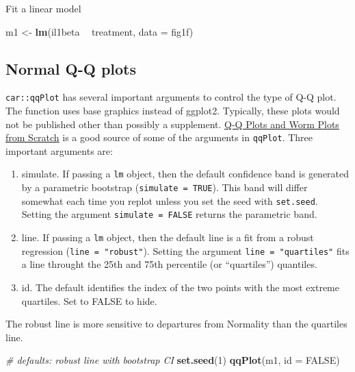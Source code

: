 \documentclass[]{book}
\newenvironment{Shaded}{\begin{snugshade}}{\end{snugshade}}
\newcommand{\CommentTok}[1]{\textcolor[rgb]{0.56,0.35,0.01}{\textit{#1}}}
\newcommand{\DataTypeTok}[1]{\textcolor[rgb]{0.13,0.29,0.53}{#1}}
\newcommand{\DecValTok}[1]{\textcolor[rgb]{0.00,0.00,0.81}{#1}}
\newcommand{\KeywordTok}[1]{\textcolor[rgb]{0.13,0.29,0.53}{\textbf{#1}}}
\newcommand{\NormalTok}[1]{#1}
\newcommand{\OperatorTok}[1]{\textcolor[rgb]{0.81,0.36,0.00}{\textbf{#1}}}
\newcommand{\OtherTok}[1]{\textcolor[rgb]{0.56,0.35,0.01}{#1}}
\newcommand{\StringTok}[1]{\textcolor[rgb]{0.31,0.60,0.02}{#1}}
\providecommand{\tightlist}{%
  \setlength{\itemsep}{0pt}\setlength{\parskip}{0pt}}
\begin{document}
Fit a linear model

\begin{Shaded}
\begin{Highlighting}[]
\NormalTok{m1 <-}\StringTok{ }\KeywordTok{lm}\NormalTok{(il1beta }\OperatorTok{~}\StringTok{ }\NormalTok{treatment,}
         \DataTypeTok{data =}\NormalTok{ fig1f)}
\end{Highlighting}
\end{Shaded}

\hypertarget{normal-q-q-plots}{%
\subsection{Normal Q-Q plots}\label{normal-q-q-plots}}

\texttt{car::qqPlot} has several important arguments to control the type of Q-Q plot. The function uses base graphics instead of ggplot2. Typically, these plots would not be published other than possibly a supplement. \href{https://www.tjmahr.com/quantile-quantile-plots-from-scratch/}{Q-Q Plots and Worm Plots from Scratch} is a good source of some of the arguments in \texttt{qqPlot}. Three important arguments are:

\begin{enumerate}
\def\labelenumi{\arabic{enumi}.}
\tightlist
\item
  simulate. If passing a \texttt{lm} object, then the default confidence band is generated by a parametric bootstrap (\texttt{simulate\ =\ TRUE}). This band will differ somewhat each time you replot unless you set the seed with \texttt{set.seed}. Setting the argument \texttt{simulate\ =\ FALSE} returns the parametric band.
\item
  line. If passing a \texttt{lm} object, then the default line is a fit from a robust regression (\texttt{line\ =\ "robust"}). Setting the argument \texttt{line\ =\ "quartiles"} fits a line throught the 25th and 75th percentile (or ``quartiles'') quantiles.
\item
  id. The default identifies the index of the two points with the most extreme quartiles. Set to FALSE to hide.
\end{enumerate}

The robust line is more sensitive to departures from Normality than the quartiles line.

\begin{Shaded}
\begin{Highlighting}[]
\CommentTok{# defaults: robust line with bootstrap CI}
\KeywordTok{set.seed}\NormalTok{(}\DecValTok{1}\NormalTok{)}
\KeywordTok{qqPlot}\NormalTok{(m1, }\DataTypeTok{id =} \OtherTok{FALSE}\NormalTok{)}
\end{Highlighting}
\end{Shaded}
\end{document}
